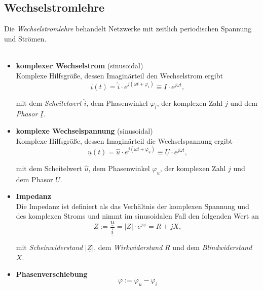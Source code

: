 \documentclass{article}
\begin{document}
\subsection{Wechselstromlehre}
Die \textit{Wechselstromlehre} behandelt Netzwerke mit zeitlich periodischen Spannung und Strömen.\\
\\
	\begin{itemize}
		\item \textbf{komplexer Wechselstrom} (sinusoidal) \\
		Komplexe Hilfsgröße, dessen Imaginärteil den Wechselstrom ergibt
			\begin{equation}
				\underline{i}(t) = \hat{i} \cdot e^{j (\omega t + \varphi_i)} \equiv \underline{I} \cdot e^{j \omega t},
			\end{equation}
		
		mit dem \textit{Scheitelwert} $\hat{i}$, dem Phasenwinkel $\varphi_i$, der komplexen Zahl $j$ und dem \textit{Phasor} $\underline{I}$.
		
		
		\item \textbf{komplexe Wechselspannung} (sinusoidal)  \\
		Komplexe Hilfsgröße, dessen Imaginärteil die Wechselspannung ergibt
			\begin{equation}
				\underline{u}(t) = \hat{u} \cdot e^{j (\omega t +  \varphi_u)} \equiv \underline{U} \cdot e^{j \omega t},
			\end{equation}
		
		mit dem Scheitelwert $\hat{u}$, dem Phasenwinkel $\varphi_u$, der komplexen Zahl $j$ und dem Phasor $\underline{U}$.
		
		\item \textbf{Impedanz}\\
		Die Impedanz ist definiert als das Verhältnis der komplexen Spannung und des komplexen Stroms und nimmt im sinusoidalen Fall den folgenden Wert an
			\begin{equation}
				\underline{Z} := \frac{\underline{u}}{\underline{i}} = |Z| \cdot e^{j\varphi} = R + j X,
			\end{equation}
		
		mit \textit{Scheinwiderstand} $|\underline{Z}|$, dem \textit{Wirkwiderstand} $R$ und dem \textit{Blindwiderstand} $X$.
		
		
		\item \textbf{Phasenverschiebung}
			\begin{equation}
				\varphi := \varphi_u - \varphi_i
			\end{equation}
	\end{itemize}
\end{document}
